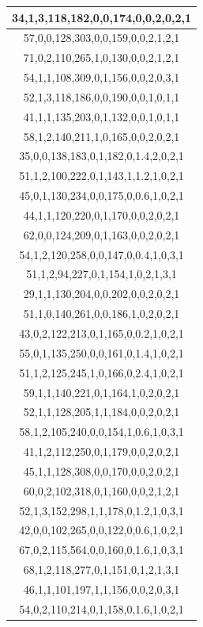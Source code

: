 \documentclass{article}
\begin{document}
\begin{table}[h!]
\begin{tabular}{|c|}
34,1,3,118,182,0,0,174,0,0,2,0,2,1 \\ \hline
57,0,0,128,303,0,0,159,0,0,2,1,2,1 \\ \hline
71,0,2,110,265,1,0,130,0,0,2,1,2,1 \\ \hline
54,1,1,108,309,0,1,156,0,0,2,0,3,1 \\ \hline
52,1,3,118,186,0,0,190,0,0,1,0,1,1 \\ \hline
41,1,1,135,203,0,1,132,0,0,1,0,1,1 \\ \hline
58,1,2,140,211,1,0,165,0,0,2,0,2,1 \\ \hline
35,0,0,138,183,0,1,182,0,1.4,2,0,2,1 \\ \hline
51,1,2,100,222,0,1,143,1,1.2,1,0,2,1 \\ \hline
45,0,1,130,234,0,0,175,0,0.6,1,0,2,1 \\ \hline
44,1,1,120,220,0,1,170,0,0,2,0,2,1 \\ \hline
62,0,0,124,209,0,1,163,0,0,2,0,2,1 \\ \hline
54,1,2,120,258,0,0,147,0,0.4,1,0,3,1 \\ \hline
51,1,2,94,227,0,1,154,1,0,2,1,3,1 \\ \hline
29,1,1,130,204,0,0,202,0,0,2,0,2,1 \\ \hline
51,1,0,140,261,0,0,186,1,0,2,0,2,1 \\ \hline
43,0,2,122,213,0,1,165,0,0.2,1,0,2,1 \\ \hline
55,0,1,135,250,0,0,161,0,1.4,1,0,2,1 \\ \hline
51,1,2,125,245,1,0,166,0,2.4,1,0,2,1 \\ \hline
59,1,1,140,221,0,1,164,1,0,2,0,2,1 \\ \hline
52,1,1,128,205,1,1,184,0,0,2,0,2,1 \\ \hline
58,1,2,105,240,0,0,154,1,0.6,1,0,3,1 \\ \hline
41,1,2,112,250,0,1,179,0,0,2,0,2,1 \\ \hline
45,1,1,128,308,0,0,170,0,0,2,0,2,1 \\ \hline
60,0,2,102,318,0,1,160,0,0,2,1,2,1 \\ \hline
52,1,3,152,298,1,1,178,0,1.2,1,0,3,1 \\ \hline
42,0,0,102,265,0,0,122,0,0.6,1,0,2,1 \\ \hline
67,0,2,115,564,0,0,160,0,1.6,1,0,3,1 \\ \hline
68,1,2,118,277,0,1,151,0,1,2,1,3,1 \\ \hline
46,1,1,101,197,1,1,156,0,0,2,0,3,1 \\ \hline
54,0,2,110,214,0,1,158,0,1.6,1,0,2,1 \\ \hline

\end{tabular}
\end{table}
\end{document}
